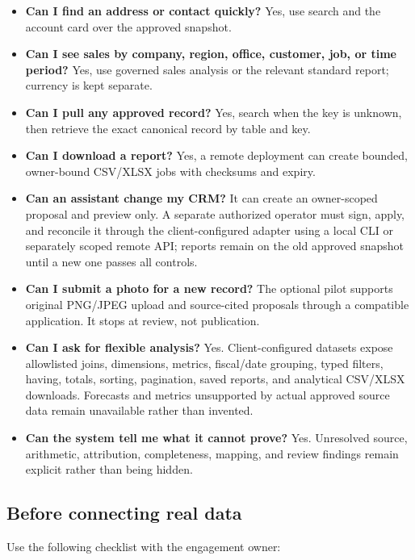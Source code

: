 \documentclass[
]{article}
\providecommand{\tightlist}{%
  \setlength{\itemsep}{0pt}\setlength{\parskip}{0pt}}
\begin{document}
\begin{itemize}
\tightlist
\item
  \textbf{Can I find an address or contact quickly?} Yes, use search and
  the account card over the approved snapshot.
\item
  \textbf{Can I see sales by company, region, office, customer, job, or
  time period?} Yes, use governed sales analysis or the relevant
  standard report; currency is kept separate.
\item
  \textbf{Can I pull any approved record?} Yes, search when the key is
  unknown, then retrieve the exact canonical record by table and key.
\item
  \textbf{Can I download a report?} Yes, a remote deployment can create
  bounded, owner-bound CSV/XLSX jobs with checksums and expiry.
\item
  \textbf{Can an assistant change my CRM?} It can create an owner-scoped
  proposal and preview only. A separate authorized operator must sign,
  apply, and reconcile it through the client-configured adapter using a
  local CLI or separately scoped remote API; reports remain on the old
  approved snapshot until a new one passes all controls.
\item
  \textbf{Can I submit a photo for a new record?} The optional pilot
  supports original PNG/JPEG upload and source-cited proposals through a
  compatible application. It stops at review, not publication.
\item
  \textbf{Can I ask for flexible analysis?} Yes. Client-configured
  datasets expose allowlisted joins, dimensions, metrics, fiscal/date
  grouping, typed filters, having, totals, sorting, pagination, saved
  reports, and analytical CSV/XLSX downloads. Forecasts and metrics
  unsupported by actual approved source data remain unavailable rather
  than invented.
\item
  \textbf{Can the system tell me what it cannot prove?} Yes. Unresolved
  source, arithmetic, attribution, completeness, mapping, and review
  findings remain explicit rather than being hidden.
\end{itemize}

\subsection{Before connecting real
data}\label{before-connecting-real-data}

Use the following checklist with the engagement owner:
\end{document}
